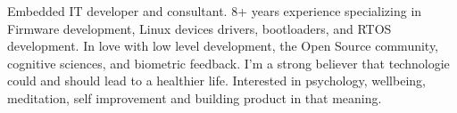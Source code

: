

\begin{cvparagraph}

Embedded IT developer and consultant. 8+ years experience specializing in Firmware development, Linux devices drivers, bootloaders, and RTOS development. In love with low level development, the Open Source community, cognitive sciences, and biometric feedback. I'm a strong believer that technologie could and should lead to a healthier life. Interested in psychology, wellbeing, meditation, self improvement and building product in that meaning.
\end{cvparagraph}
